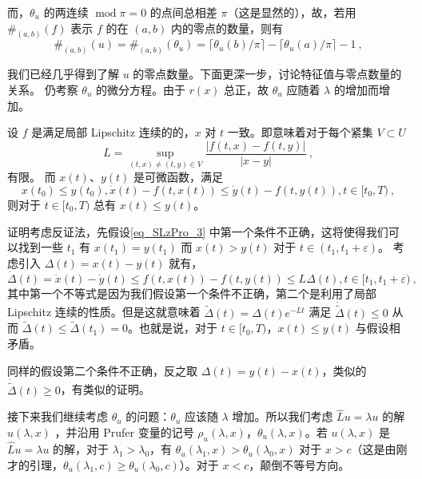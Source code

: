 而，$\theta_u$ 的两连续 $\operatorname{mod} \pi = 0$ 的点间总相差 $\pi$（这是显然的），故，若用 $\#_{(a, b)}(f)$ 表示 $f$ 的在 $(a, b)$ 内的零点的数量，则有
\begin{equation}
\#_{(a, b)} (u) = \#_{(a, b)} (\theta_u) = \lceil \theta_u(b)/\pi \rceil - \lceil \theta_u(a)/\pi \rceil -1~,
\end{equation}

我们已经几乎得到了解 $u$ 的零点数量。下面更深一步，讨论特征值与零点数量的关系。
仍考察 $\theta_u$ 的微分方程。由于 $r(x)$ 总正，故 $\theta_u$ 应随着 $\lambda$ 的增加而增加。
\begin{lemma}{}
设 $f$ 是满足局部 Lipschitz 连续的的，$x$ 对 $t$ 一致。即意味着对于每个紧集 $V \subset U$
\begin{equation}
L = \sup_{(t, x) \neq (t, y) \in V} \frac{|f(t, x) - f(t, y)|}{|x-y|} ~,
\end{equation}
有限。
而 $x(t)$、$y(t)$ 是可微函数，满足
\begin{equation}\label{eq_SLzPro_3}
x(t_0) \le y(t_0), \dot x(t)-f(t, x (t)) \le \dot y(t) - f(t, y(t)), t \in [t_0, T) ~,
\end{equation}
则对于 $t \in [t_0, T)$ 总有 $x(t) \le y(t)$。
\end{lemma}
证明考虑反证法，先假设\autoref{eq_SLzPro_3} 中第一个条件不正确，这将使得我们可以找到一些 $t_1$ 有 $x(t_1) = y(t_1)$ 而 $x(t) > y(t)$ 对于 $t \in (t_1, t_1 + \varepsilon)$。 考虑引入 $\Delta(t) = x(t) - y(t)$ 就有，
\begin{equation}
\dot \Delta(t) = \dot x(t) - \dot y(t) \le f(t, x(t)) - f(t, y(t)) \le L\Delta(t), t \in [t_1, t_1 + \varepsilon) ~,
\end{equation}
其中第一个不等式是因为我们假设第一个条件不正确，第二个是利用了局部 Lipschitz 连续的性质。但是这就意味着 $\widetilde \Delta(t) = \Delta(t) e^{-Lt}$ 满足 $\dot{\widetilde \Delta}(t) \le 0$ 从而 $\widetilde \Delta(t)\le \widetilde \Delta(t_1) = 0$。也就是说，对于 $t \in[t_0, T)$，$x (t)\le y (t)$ 与假设相矛盾。

同样的假设第二个条件不正确，反之取 $\Delta(t) = y(t)-x(t)$，类似的 $\dot{\widetilde \Delta}(t) \ge 0$，有类似的证明。

接下来我们继续考虑 $\theta_u$ 的问题：$\theta_u$ 应该随 $\lambda$ 增加。所以我们考虑 $\hat Lu = \lambda u$ 的解 $u (\lambda, x)$ ，并沿用 Prufer 变量的记号 $\rho_u (\lambda, x)$，$\theta_u (\lambda, x)$。若 $u(\lambda, x)$ 是 $\hat Lu = \lambda u$ 的解，对于 $\lambda_1 > \lambda_0$，有 $\theta_u (\lambda_1, x) > \theta_u (\lambda_0, x)$ 对于 $x > c$（这是由刚才的引理，$\theta_u (\lambda_1, c)\ge \theta_u (\lambda_0,c)$）。对于 $x < c$，颠倒不等号方向。

